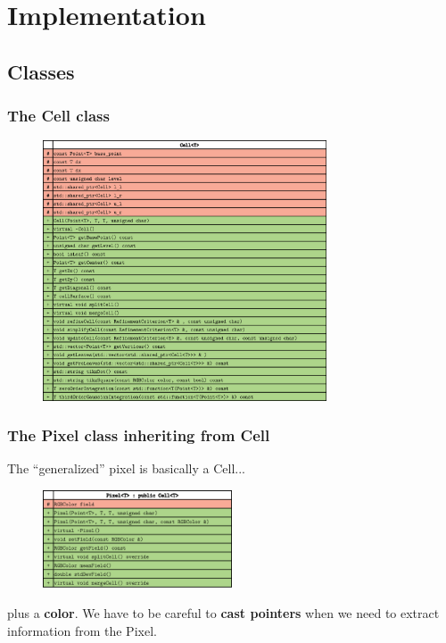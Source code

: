 \documentclass[8pt]{beamer}
\begin{document}
\section{Implementation}

\subsection{Classes}
\begin{frame}
 \frametitle{The Cell class}
  \begin{figure}[!h]
\begin{center}
\includegraphics[width=0.75\textwidth]{./figures/cell_h.eps}
\end{center}
\end{figure}
\end{frame}

\begin{frame}
 \frametitle{The Pixel class inheriting from Cell}
 The ``generalized'' pixel is basically a Cell...
  \begin{figure}[!h]
\begin{center}
\includegraphics[width=0.5\textwidth]{./figures/pixel_h.eps}
\end{center}
\end{figure}
plus a \textbf{color}.
We have to be careful to \textbf{cast pointers} when we need to extract information from the Pixel.
\end{frame}
\end{document}
